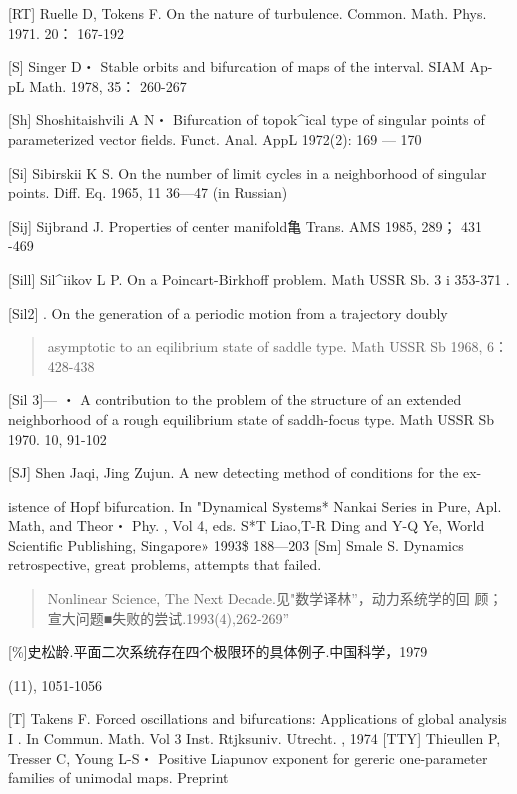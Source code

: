\documentclass{article}
\begin{document}
{[}RT{]} Ruelle D, Tokens F. On the nature of turbulence. Common. Math.
Phys. 1971. 20： 167-192

{[}S{]} Singer D・ Stable orbits and bifurcation of maps of the
interval. SIAM Ap- pL Math. 1978, 35： 260-267

{[}Sh{]} Shoshitaishvili A N・ Bifurcation of topok\^{}ical type of
singular points of parameterized vector fields. Funct. Anal. AppL
1972(2): 169 --- 170

{[}Si{]} Sibirskii K S. On the number of limit cycles in a neighborhood
of singular points. Diff. Eq. 1965, 11 36---47 (in Russian)

{[}Sij{]} Sijbrand J. Properties of center manifold亀 Trans. AMS 1985,
289； 431 -469

{[}Sill{]} Sil\^{}iikov L P. On a Poincart-Birkhoff problem. Math USSR
Sb. 3 i 353-371 .

{[}Sil2{]} . On the generation of a periodic motion from a trajectory
doubly

\begin{quote}
asymptotic to an eqilibrium state of saddle type. Math USSR Sb 1968, 6：
428-438
\end{quote}

{[}Sil 3{]}--- ・ A contribution to the problem of the structure of an
extended neighborhood of a rough equilibrium state of saddh-focus type.
Math USSR Sb 1970. 10, 91-102

{[}SJ{]} Shen Jaqi, Jing Zujun. A new detecting method of conditions for
the ex-

istence of Hopf bifurcation. In "Dynamical Systems* Nankai Series in
Pure, Apl. Math, and Theor・ Phy. , Vol 4, eds. S*T Liao,T-R Ding and
Y-Q Ye, World Scientific Publishing, Singapore» 1993\$ 188---203
{[}Sm{]} Smale S. Dynamics retrospective, great problems, attempts that
failed.

\begin{quote}
Nonlinear Science, The Next Decade.见"数学译林''，动力系统学的回
顾；宣大问题■失败的尝试.1993(4),262-269''
\end{quote}

{[}\%{]}史松龄.平面二次系统存在四个极限环的具体例子.中国科学，1979

(11), 1051-1056

{[}T{]} Takens F. Forced oscillations and bifurcations: Applications of
global analysis I . In Commun. Math. Vol 3 Inst. Rtjksuniv. Utrecht. ,
1974 {[}TTY{]} Thieullen P, Tresser C, Young L-S・ Positive Liapunov
exponent for gereric one-parameter families of unimodal maps. Preprint
\end{document}
